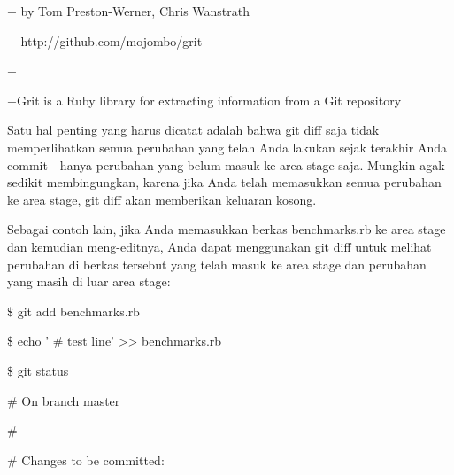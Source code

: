 \noindent 
{\fontsize{14pt}{14pt}\selectfont + by Tom Preston-Werner, Chris Wanstrath \\} \par
\noindent 
{\fontsize{14pt}{14pt}\selectfont + http://github.com/mojombo/grit \\} \par
\noindent 
{\fontsize{14pt}{14pt}\selectfont + \\} \par
\noindent 
{\fontsize{14pt}{14pt}\selectfont +Grit is a Ruby library for extracting information from a Git repository \\} \par
\noindent 
{\fontsize{14pt}{14pt}\selectfont Satu hal penting yang harus dicatat adalah bahwa $  $git diff $  $saja tidak memperlihatkan semua perubahan yang telah Anda lakukan sejak terakhir Anda commit - hanya perubahan yang belum masuk ke area stage saja. Mungkin agak sedikit membingungkan, karena jika Anda telah memasukkan semua perubahan ke area stage, $  $git diff $  $akan memberikan keluaran kosong. \\} \par
\noindent 
{\fontsize{14pt}{14pt}\selectfont Sebagai contoh lain, jika Anda memasukkan berkas benchmarks.rb ke area stage dan kemudian meng-editnya, Anda dapat menggunakan $  $git diff $  $untuk melihat perubahan di berkas tersebut yang telah masuk ke area stage dan perubahan yang masih di luar area stage: \\} \par
\vspace{14pt}
\noindent 
{\fontsize{14pt}{14pt}\selectfont  $  \$  $ git add benchmarks.rb \\} \par
\noindent 
{\fontsize{14pt}{14pt}\selectfont  $  \$  $ echo ' $  \#  $ test line' >> benchmarks.rb \\} \par
\noindent 
{\fontsize{14pt}{14pt}\selectfont  $  \$  $ git status \\} \par
\noindent 
{\fontsize{14pt}{14pt}\selectfont  $  \#  $ On branch master \\} \par
\noindent 
{\fontsize{14pt}{14pt}\selectfont  $  \#  $ \\} \par
\noindent 
{\fontsize{14pt}{14pt}\selectfont  $  \#  $ Changes to be committed: \\} \par
